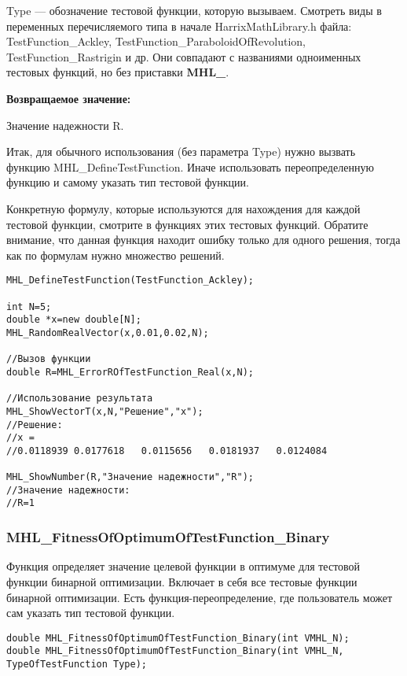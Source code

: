 \documentclass[a4paper,12pt]{article}
\begin{document}
Type --- обозначение тестовой функции, которую вызываем.
Смотреть виды в переменных перечисляемого типа в начале HarrixMathLibrary.h файла: TestFunction\_Ackley, TestFunction\_ParaboloidOfRevolution, TestFunction\_Rastrigin и др. Они совпадают с названиями одноименных тестовых функций, но без приставки \textbf{MHL\_}.

\textbf{Возвращаемое значение:}
 
Значение надежности R.

Итак, для обычного использования (без параметра Type) нужно вызвать функцию MHL\_DefineTestFunction. Иначе использовать переопределенную функцию и самому указать тип тестовой функции.

Конкретную формулу, которые используются для нахождения для каждой тестовой функции, смотрите в функциях этих тестовых функций. Обратите внимание, что данная функция находит ошибку только для одного решения, тогда как по формулам нужно множество решений.


\begin{lstlisting}[label=code_use_MHL_ErrorROfTestFunction_Real,caption=Пример использования]
MHL_DefineTestFunction(TestFunction_Ackley);

int N=5;
double *x=new double[N];
MHL_RandomRealVector(x,0.01,0.02,N);

//Вызов функции
double R=MHL_ErrorROfTestFunction_Real(x,N);

//Использование результата
MHL_ShowVectorT(x,N,"Решение","x");
//Решение:
//x =
//0.0118939	0.0177618	0.0115656	0.0181937	0.0124084

MHL_ShowNumber(R,"Значение надежности","R");
//Значение надежности:
//R=1
\end{lstlisting}

\subsubsection{MHL\_FitnessOfOptimumOfTestFunction\_Binary}\label{MHL_FitnessOfOptimumOfTestFunction_Binary}

Функция определяет значение целевой функции в оптимуме для тестовой функции бинарной оптимизации. Включает в себя все тестовые функции бинарной оптимизации. Есть функция-переопределение, где пользователь может сам указать тип тестовой функции.


\begin{lstlisting}[label=code_syntax_MHL_FitnessOfOptimumOfTestFunction_Binary,caption=Синтаксис]
double MHL_FitnessOfOptimumOfTestFunction_Binary(int VMHL_N);
double MHL_FitnessOfOptimumOfTestFunction_Binary(int VMHL_N, TypeOfTestFunction Type);
\end{lstlisting}
\end{document}
